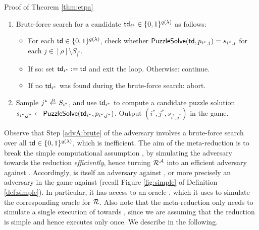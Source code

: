 \begin{namedproof}{Proof of Theorem \ref{thm:etpa}}
\begin{enumerate}[itemsep=0.1cm]
\begin{itemize}[label={\textbullet},itemsep=0.1cm]
          \end{itemize}
     \item\label{advA:brute} Brute-force search for a candidate \(\mathsf{td}_{i^{*}} \in \{0,1\}^{q(\lambda)}\) as follows:
          \begin{itemize}[label={\textbullet},itemsep=0.1cm]
            \item For each \(\mathsf{td} \in \{0,1\}^{q(\lambda)}\),
                  check whether \(\mathsf{PuzzleSolve}(\mathsf{td},p_{i^{*},j}) = s_{i^{*},j}\) for each \(j \in [\rho] \setminus S_{i^{*}}\).
            \item If so: set \(\mathsf{td}_{i^{*}} := \mathsf{td}\) and exit the loop. Otherwise: continue.
            \item If no \(\mathsf{td}_{i^{*}}\) was found during the brute-force search: abort.
          \end{itemize}
    \item\label{advA:final} Sample \(j^{*} \sampleR S_{i^{*}}\),
          and use \(\mathsf{td}_{i^{*}}\) to compute a candidate puzzle solution
          \(s_{i^{*}, j^{*}} \leftarrow \mathsf{PuzzleSolve}(\mathsf{td}_{i^{*}},p_{i^{*}, j^{*}})\).
          Output \((i^{*}, j^{*}, s_{i^{*}, j^{*}})\) in the \ETPA game.
  \end{enumerate}

  Observe that Step \ref{advA:brute} of the adversary \advA involves a brute-force search
  over all \(\mathsf{td} \in \{0,1\}^{q(\lambda)}\), which is inefficient.
  The aim of the meta-reduction \redM is to break the simple computational assumption \Simple,
  by simulating the adversary \advA towards the reduction \redR \emph{efficiently},
  hence turning \(\redR^{\advA}\) into an efficient adversary against \Simple.
  Accordingly, \redM is itself an adversary against \Simple,
  or more precisely an adversary in the game \SICA against \Simple
  (recall Figure \ref{fig:simple} of Definition \ref{def:simple}).
  In particular, it has access to an oracle \oracle,
  which it uses to simulate the corresponding oracle for \(\redR\).
  Also note that the meta-reduction \redM only needs to simulate a single
  execution of \advA towards \redR,
  since we are assuming that the reduction \redR is simple
  and hence executes \advA only once.
  We describe \redM in the following.


\end{namedproof}
